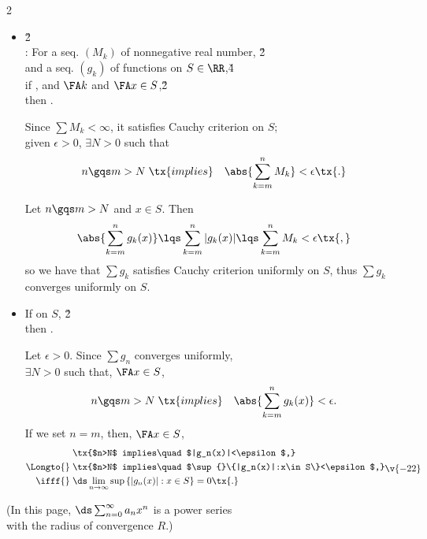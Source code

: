 \documentclass[dvipdfmx,a4paper,titlepage,9pt]{jsarticle}
\begin{document}
\begin{multicols*}{2}
\begin{itemize}[label={-}]
\vfill\null\columnbreak

\item{} \v2\\
: For a seq. $(M_k)$ of nonnegative real number, \v2\\
\;\;and a seq. $(g_k)$ of functions on $S\in\RR$,\v4\\
\;\;if , and \; $\FA k$ and $\FA x\in S$,\v2\\
\;\;then .
\begin{Pfbox}
Since $\sum M_k<\infty$, it satisfies Cauchy criterion on $S$;\\
given $\epsilon>0$, $\exists N>0$ such that
$$n\gqs m>N\;\tx{implies}\quad\abs{\sum_{k=m}^nM_k}<\epsilon\tx{.}$$

Let $n\gqs m>N$ and $x\in S$. Then
$$\abs{\sum_{k=m}^ng_k(x)}\lqs\sum_{k=m}^n|g_k(x)|\lqs\sum_{k=m}^n M_k<\epsilon\tx{,}$$
so we have that $\sum g_k$ satisfies Cauchy criterion uniformly on $S$, thus $\sum g_k$ converges uniformly on $S$.
\end{Pfbox} \;

\item If  on $S$, \v2\\
      then .
\begin{Pfbox}
Let $\epsilon>0$. Since $\sum g_n$ converges uniformly,\\
$\exists N>0$ such that, $\FA x\in S$,
$$n\gqs m>N\;\tx{implies}\quad\abs{\sum_{k=m}^ng_k(x)}<\epsilon{.}$$
If we set $n=m$, then, $\FA x\in S$, 
$$\begin{aligned}
            & \;\tx{$n>N$ implies\quad$|g_n(x)|<\epsilon$,}\\
  \Longto{} & \;\tx{$n>N$ implies\quad$\sup{}\{|g_n(x)|:x\in S\}<\epsilon$,}\\
    \ifff{} & \;\ds\lim_{n\to\infty}\sup{}\{|g_n(x)|:x\in S\}=0\tx{.}
  \end{aligned}\v{-22}$$
\end{Pfbox}
\end{itemize}

\newpage


(In this page, $\ds\sum_{n=0}^\infty a_nx^n$ is a power series\\
\quad with the radius of convergence $R$.) \\


\end{multicols*}
\end{document}
